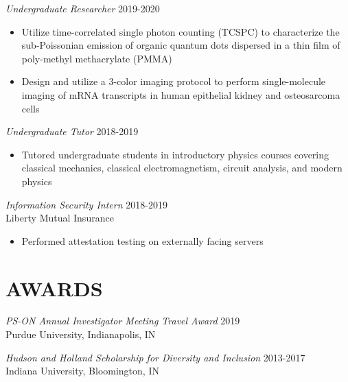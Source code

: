 \documentclass[margin, 10pt]{res} %
\begin{document}
\begin{resume}
\begin{itemize}
\end{itemize}
 
{\sl Undergraduate Researcher} \hfill 2019-2020
\begin{itemize} \itemsep -2pt %

\item Utilize time-correlated single photon counting (TCSPC) to characterize the sub-Poissonian emission of organic quantum dots dispersed in a thin film of poly-methyl methacrylate (PMMA)

\item Design and utilize a 3-color imaging protocol to perform single-molecule imaging of mRNA transcripts in human epithelial kidney and osteosarcoma cells 

\end{itemize} 


{\sl Undergraduate Tutor} \hfill 2018-2019
\begin{itemize} \itemsep -2pt %

\item Tutored undergraduate students in introductory physics courses covering classical mechanics, classical electromagnetism, circuit analysis, and modern physics

\end{itemize} 
\vspace{1in}
{\sl Information Security Intern} \hfill 2018-2019\\
Liberty Mutual Insurance
\begin{itemize} \itemsep -2pt %

\item Performed attestation testing on externally facing servers

\end{itemize} 


\section{AWARDS}

{\sl PS-ON Annual Investigator Meeting Travel Award} \hfill 2019 \\
Purdue University, Indianapolis, IN 

{\sl Hudson and Holland Scholarship for Diversity and Inclusion} \hfill 2013-2017 \\
Indiana University, Bloomington, IN 


\end{resume}
\end{document}
